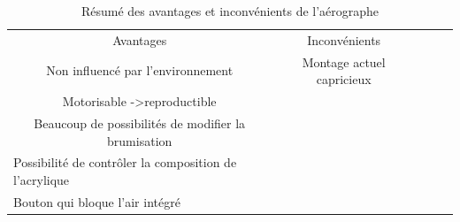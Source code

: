 \begin{table}[H]
    \centering
    \begin{tabular}{|c|c|lll}
        \cline{1-2}
        Avantages                                                                                            & Inconvénients                                     &  &  & \\ \cline{1-2}
        \cellcolor[HTML]{67FD9A}Non influencé par l'environnement                                            & \cellcolor[HTML]{FD6864}Montage actuel capricieux &  &  & \\ \cline{1-2}
        \cellcolor[HTML]{67FD9A}Motorisable -\textgreater reproductible                                      & \cellcolor[HTML]{FFFFFF}                          &  &  & \\ \cline{1-2}
        \cellcolor[HTML]{67FD9A}Beaucoup de possibilités de modifier la brumisation                          & \cellcolor[HTML]{FFFFFF}                          &  &  & \\ \cline{1-2}
        \multicolumn{1}{|l|}{\cellcolor[HTML]{67FD9A}Possibilité de contrôler la composition de l'acrylique} & \multicolumn{1}{l|}{}                             &  &  & \\ \cline{1-2}
        \multicolumn{1}{|l|}{\cellcolor[HTML]{67FD9A}Bouton qui bloque l'air intégré}                        & \multicolumn{1}{l|}{}                             &  &  & \\ \cline{1-2}
    \end{tabular}
    \caption{Résumé des avantages et inconvénients de l'aérographe}
    \label{tab:aerographe_table}
\end{table}
